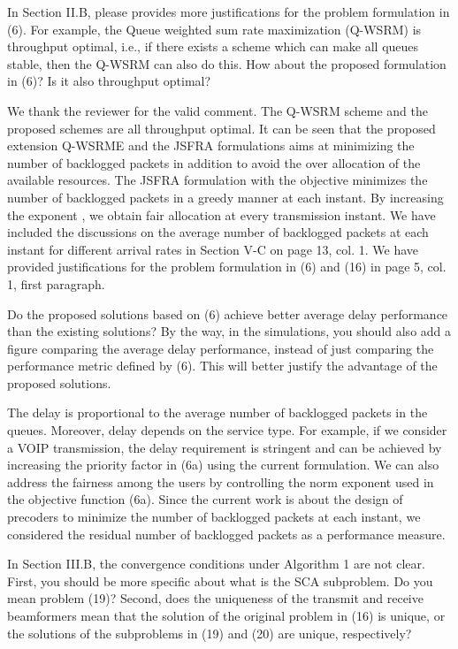 \begin{itemize}

 In Section II.B, please provides more justifications for the problem formulation in (6). For example, the Queue weighted sum rate maximization (Q-WSRM) is throughput optimal, i.e., if there exists a scheme which can make all queues stable, then the Q-WSRM can also do this. How about the proposed formulation in (6)? Is it also throughput optimal? 

\resp We thank the reviewer for the valid comment. The Q-WSRM scheme and the proposed schemes are all throughput optimal. It can be seen that the proposed extension Q-WSRME and the JSFRA formulations aims at minimizing the number of backlogged packets in addition to avoid the over allocation of the available resources. The JSFRA formulation with the  objective minimizes the number of backlogged packets in a greedy manner at each instant. By increasing the exponent , we obtain fair allocation at every transmission instant. We have included the discussions on the average number of backlogged packets at each instant for different arrival rates in Section V-C on page 13, col. 1. We have provided justifications for the problem formulation in (6) and (16) in page 5, col. 1, first paragraph.

 Do the proposed solutions based on (6) achieve better average delay performance than the existing solutions? By the way, in the simulations, you should also add a figure comparing the average delay performance, instead of just comparing the performance metric defined by (6). This will better justify the advantage of the proposed solutions.

\resp The delay is proportional to the average number of backlogged packets in the queues. Moreover, delay depends on the service type. For example, if we consider a VOIP transmission, the delay requirement is stringent and can be achieved by increasing the priority factor  in (6a) using the current formulation. We can also address the fairness among the users by controlling the norm exponent  used in the objective function (6a). Since the current work is about the design of precoders to minimize the number of backlogged packets at each instant, we considered the residual number of backlogged packets as a performance measure.

 In Section III.B, the convergence conditions under Algorithm 1 are not clear. First, you should be more specific about what is the SCA subproblem. Do you mean problem (19)? Second, does the uniqueness of the transmit and receive beamformers mean that the solution of the original problem in (16) is unique, or the solutions of the subproblems in (19) and (20) are unique, respectively?


\end{itemize}
